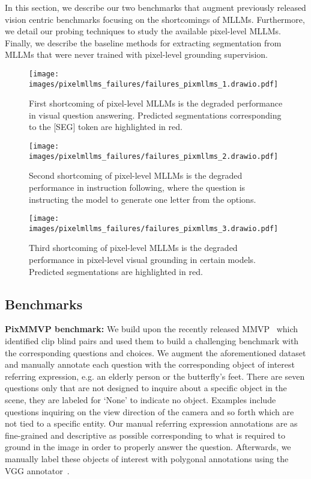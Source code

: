 In this section, we describe our two benchmarks that augment previously released vision centric benchmarks focusing on the shortcomings of MLLMs. Furthermore, we detail our probing techniques to study the available pixel-level MLLMs. Finally, we describe the baseline methods for extracting segmentation from MLLMs that were never trained with pixel-level grounding supervision.

\begin{figure*}[t]
\centering
\texttt{[image: images/pixelmllms\_failures/failures\_pixmllms\_1.drawio.pdf]}
\vspace{-2em}
\caption{First shortcoming of pixel-level MLLMs is the degraded performance in visual question answering. Predicted segmentations corresponding to the [SEG] token are highlighted in red.} 
\vspace{-1em}
\label{fig:shortcoming1}
\end{figure*}

\begin{figure}[t]
\centering
\texttt{[image: images/pixelmllms\_failures/failures\_pixmllms\_2.drawio.pdf]}
\vspace{-2em}
\caption{Second shortcoming of pixel-level MLLMs is the degraded performance in instruction following, where the question is instructing the model to generate one letter from the options.} 
\vspace{-1.5em}
\label{fig:shortcoming2}
\end{figure}


\begin{figure*}[t]
\centering
\texttt{[image: images/pixelmllms\_failures/failures\_pixmllms\_3.drawio.pdf]}
\caption{Third shortcoming of pixel-level MLLMs is the degraded performance in pixel-level visual grounding in certain models. Predicted segmentations are highlighted in red.} 
\vspace{-0.5em}
\label{fig:shortcoming3}
\end{figure*}


\subsection{Benchmarks}
\textbf{PixMMVP benchmark:} We build upon the recently released MMVP~\cite{tong2024eyes} which identified clip blind pairs and used them to build a challenging benchmark with the corresponding questions and choices. We augment the aforementioned dataset and manually annotate each question with the corresponding object of interest referring expression, e.g. an elderly person or the butterfly's feet. There are seven questions only that are not designed to inquire about a specific object in the scene, they are labeled for `None' to indicate no object. Examples include questions inquiring on the view direction of the camera and so forth which are not tied to a specific entity. Our manual referring expression annotations are as fine-grained and descriptive as possible corresponding to what is required to ground in the image in order to properly answer the question. Afterwards, we manually label these objects of interest with polygonal annotations using the VGG annotator~\cite{dutta2016via}.

